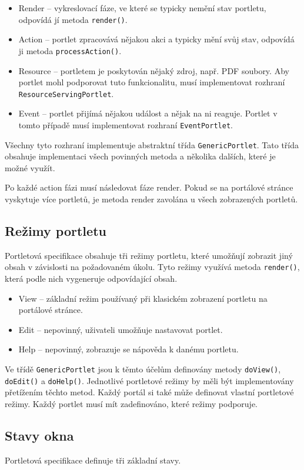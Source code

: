 \documentclass{fithesis}
\begin{document}
\begin{itemize}
\item Render -- vykreslovací fáze, ve které se typicky nemění stav portletu, odpovídá jí metoda \verb|render()|.
\item Action -- portlet zpracovává nějakou akci a typicky mění svůj stav, odpovídá ji metoda \verb|processAction()|.
\item Resource -- portletem je poskytován nějaký zdroj, např. PDF soubory. Aby portlet mohl podporovat tuto funkcionalitu, musí implementovat rozhraní \verb|ResourceServingPortlet|.
\item Event -- portlet přijímá nějakou událost a nějak na ni reaguje. Portlet v tomto případě musí implementovat rozhraní \verb|EventPortlet|.
\end{itemize}

Všechny tyto rozhraní implementuje abstraktní třída \verb|GenericPortlet|. Tato třída obsahuje implementaci všech povinných metoda a několika dalších, které je možné využít.

Po každé action fázi musí následovat fáze render. Pokud se na portálové stránce vyskytuje více portletů, je metoda render zavolána u všech zobrazených portletů. 

\subsection{Režimy portletu}
Portletová specifikace obsahuje tři režimy portletu, které umožňují zobrazit jiný obsah v závislosti na požadovaném úkolu. Tyto režimy využívá metoda \verb|render()|, která podle nich vygeneruje odpovídající obsah.

\begin{itemize}
\item View -- základní režim používaný při klasickém zobrazení portletu na portálové stránce.
\item Edit -- nepovinný, uživateli umožňuje nastavovat portlet.
\item Help -- nepovinný, zobrazuje se nápověda k danému portletu.
\end{itemize}

Ve třídě \verb|GenericPortlet| jsou k těmto účelům definovány metody \verb|doView()|, \verb|doEdit()| a \verb|doHelp()|. Jednotlivé portletové režimy by měli být implementovány přetížením těchto metod. Každý portál si také může definovat vlastní portletové režimy. Každý portlet musí mít zadefinováno, které režimy podporuje.

\subsection{Stavy okna}
Portletová specifikace definuje tři základní stavy.
\end{document}
